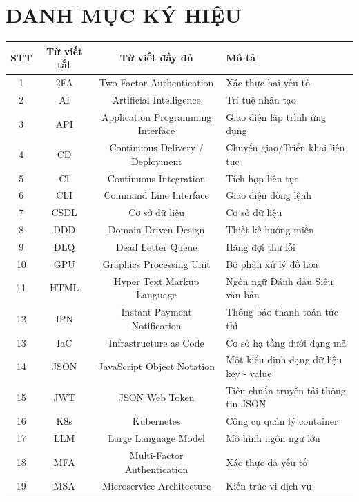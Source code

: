 \newpage
{\centering \section*{DANH MỤC KÝ HIỆU}} %

\begin{table}[ht]
\centering
\begin{tabular}{|c|c|c|l|}
\hline
\textbf{STT} & \textbf{Từ viết tắt} & \textbf{Từ viết đầy đủ} & \textbf{Mô tả} \\ \hline
1 & 2FA & Two-Factor Authentication & Xác thực hai yếu tố \\ \hline
2 & AI & Artificial Intelligence & Trí tuệ nhân tạo \\ \hline
3 & API & Application Programming Interface & Giao diện lập trình ứng dụng \\ \hline
4 & CD & Continuous Delivery / Deployment & Chuyển giao/Triển khai liên tục \\ \hline
5 & CI & Continuous Integration & Tích hợp liên tục \\ \hline
6 & CLI & Command Line Interface & Giao diện dòng lệnh \\ \hline
7 & CSDL & Cơ sở dữ liệu & Cơ sở dữ liệu \\ \hline
8 & DDD & Domain Driven Design & Thiết kế hướng miền \\ \hline
9 & DLQ & Dead Letter Queue & Hàng đợi thư lỗi \\ \hline
10 & GPU & Graphics Processing Unit & Bộ phận xử lý đồ họa \\ \hline
11 & HTML & Hyper Text Markup Language & Ngôn ngữ Đánh dấu Siêu văn bản \\ \hline
12 & IPN & Instant Payment Notification & Thông báo thanh toán tức thì \\ \hline
13 & IaC & Infrastructure as Code & Cơ sở hạ tầng dưới dạng mã \\ \hline
14 & JSON & JavaScript Object Notation & Một kiểu định dạng dữ liệu key - value \\ \hline
15 & JWT & JSON Web Token & Tiêu chuẩn truyền tải thông tin JSON \\ \hline
16 & K8s & Kubernetes & Công cụ quản lý container \\ \hline
17 & LLM & Large Language Model & Mô hình ngôn ngữ lớn \\ \hline
18 & MFA & Multi-Factor Authentication & Xác thực đa yếu tố \\ \hline
19 & MSA & Microservice Architecture & Kiến trúc vi dịch vụ \\ \hline

\end{tabular}
\end{table}
